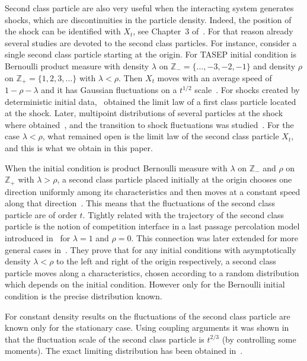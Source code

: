 \documentclass[12pt,a4paper]{article}
\numberwithin{equation}{section}
\newcommand{\Z}{\mathbb{Z}}
\begin{document}
Second class particle are also very useful when the interacting system generates shocks, which are discontinuities in the particle density. Indeed, the position of the shock can be identified with $X_t$, see Chapter~3 of~\cite{Li99}. For that reason already several studies are devoted to the second class particles. For instance, consider a single second class particle starting at the origin. For TASEP initial condition is Bernoulli product measure with density $\lambda$ on $\Z_-=\{\ldots,-3,-2,-1\}$ and density $\rho$ on $\Z_+=\{1,2,3,\ldots\}$ with $\lambda<\rho$. Then $X_t$ moves with an average speed of $1-\rho-\lambda$ and it has Gaussian fluctuations on a $t^{1/2}$ scale~\cite{Fer90,FF94b,PG90,FMP09}.  For shocks created  by deterministic initial data,~\cite{FN13}  obtained the limit law of a first class particle located at the shock. Later, multipoint distributions of several particles at the shock where obtained~\cite{FN16}, and the transition to shock fluctuations was studied~\cite{N17}. For the case $\lambda<\rho$, what remained open is the limit law of the second class particle $X_t$, and this is what we obtain in this paper.

When the initial condition is product Bernoulli measure with $\lambda$ on $\mathbb{Z}_{-}$ and $\rho$ on $\mathbb{Z}_{+}$ with $\lambda> \rho$, a second class particle placed
initially at the origin chooses one direction uniformly among its characteristics and then moves at a constant speed along that direction~\cite{FK95,MG05}. This means that the
fluctuations of the second class particle are of order $t$. Tightly related with the trajectory of the second class particle is the notion of competition interface in a last
passage percolation model introduced in~\cite{FP05B} for $\lambda=1$ and $\rho=0$. This connection was later extended for more general cases in~\cite{FMP09}. They prove that
for any initial conditions with asymptotically density $\lambda<\rho$ to the left and right of the origin respectively, a second class particle moves along a characteristics,
chosen according to a random distribution which depends on the initial condition. However only for the Bernoulli initial condition is the precise distribution known.

For constant density results on the fluctuations of the second class particle are known only for the stationary case. Using coupling arguments it was shown in~\cite{BS08} that
the fluctuation scale of the second class particle is $t^{2/3}$ (by controlling some moments). The exact limiting distribution has been obtained in~\cite{FS05a}.
\end{document}
